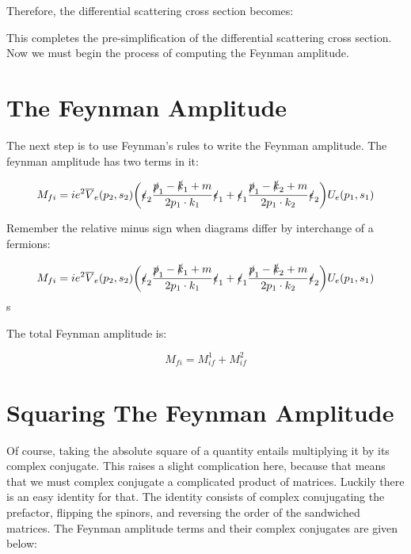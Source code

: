 \documentclass[a4]{article}
\begin{document}
    Therefore, the differential scattering cross section becomes:

    \begin{center}
    \end{center}

    This completes the pre-simplification of the differential scattering cross section. Now we must begin the process of computing the Feynman amplitude.

    \section*{The Feynman Amplitude}

    The next step is to use Feynman's rules to write the Feynman amplitude. The feynman amplitude has two terms in it:

    \begin{equation}
        M_{fi} = i e^2 \overline{V}_e (p_2, s_2) \bigg( \slashed{\epsilon}_2 \frac{\slashed{p}_1 - \slashed{k}_1 + m}{2 p_1 \cdot k_1} \slashed{\epsilon}_1  + \slashed{\epsilon}_1 \frac{\slashed{p}_1 - \slashed{k}_2 + m}{2 p_1 \cdot k_2} \slashed{\epsilon}_2 \bigg) U_e (p_1, s_1)
    \end{equation}

    Remember the relative minus sign when diagrams differ by interchange of a fermions:

    \begin{equation}
        M_{fi} = i e^2 \overline{V}_e (p_2, s_2) \bigg( \slashed{\epsilon}_2 \frac{\slashed{p}_1 - \slashed{k}_1 + m}{2 p_1 \cdot k_1} \slashed{\epsilon}_1  + \slashed{\epsilon}_1 \frac{\slashed{p}_1 - \slashed{k}_2 + m}{2 p_1 \cdot k_2} \slashed{\epsilon}_2 \bigg) U_e (p_1, s_1)
    \end{equation}s

    The total Feynman amplitude is:

    \begin{equation}
        M_{fi} = M_{if}^1 + M_{if}^2
    \end{equation}

    \section*{Squaring The Feynman Amplitude}

    Of course, taking the absolute square of a quantity entails multiplying it by its complex conjugate. This raises a slight complication here, because that means that we must complex conjugate a complicated product of matrices. Luckily there is an easy identity for that. The identity
    consists of complex conujugating the prefactor, flipping the spinors, and reversing the order of the sandwiched matrices. The Feynman amplitude terms and their complex conjugates are given below:
\end{document}
